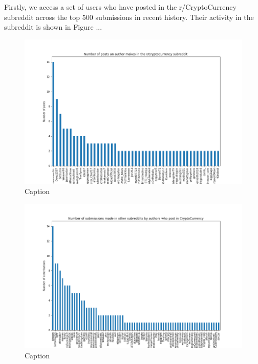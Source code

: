 \documentclass[twoside]{report}
\begin{document}
\begin{spacing}{1}
Firstly, we access a set of users who have posted in the r/CryptoCurrency subreddit across the top $500$ submissions in recent history. Their activity in the subreddit is shown in Figure ... 

\begin{figure}
    \centering
    \includegraphics[width=\linewidth]{Reddit_Analysis/Network_Analysis/num_posts_r_crypto.png}
    \caption{Caption}
    \label{fig:num_posts_r_crypto}
\end{figure}

\begin{figure}
    \centering
    \includegraphics[width=\linewidth]{Reddit_Analysis/Network_Analysis/other_subs_contributions.png}
    \caption{Caption}
    \label{fig:other_subs_contributions}
\end{figure}


\end{spacing}
\end{document}
